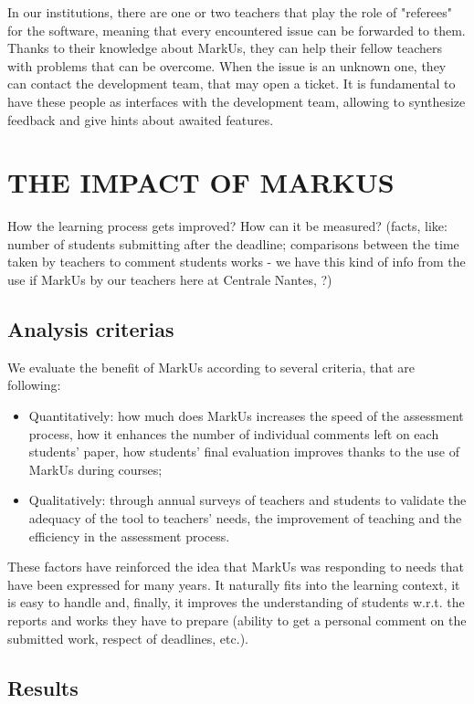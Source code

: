 \documentclass[twocolumn,10pt]{asme2e}
\begin{document}
In our institutions, there are one or two teachers that play the role of "referees" for the software, meaning that every encountered issue can be forwarded to them. Thanks to their knowledge about MarkUs, they can help their fellow teachers with problems that can be overcome. When the issue is an unknown one, they can contact the development team, that may open a ticket. It is fundamental to have these people as interfaces with the development team, allowing to synthesize feedback and give hints about awaited features. 

\section*{THE IMPACT OF MARKUS}

How the learning process gets improved? How can it be measured? (facts, like: number of students submitting after the deadline; comparisons between the time taken by teachers to comment students works - we have this kind of info from the use if MarkUs by our teachers here at Centrale Nantes, ?)

\subsection*{Analysis criterias}

We evaluate the benefit of MarkUs according to several criteria, that are following: 
\begin{itemize}
\item Quantitatively: how much does MarkUs increases the speed of the assessment process, how it enhances the number of individual comments left on each students' paper, how students' final evaluation improves thanks to the use of MarkUs during courses;
\item Qualitatively: through annual surveys of teachers and students to validate the adequacy of the tool to teachers' needs, the improvement of teaching and the efficiency in the assessment process.
\end{itemize}
These factors have reinforced the idea that MarkUs was responding to needs that have been expressed for many years. It naturally fits into the learning context, it is easy to handle and, finally, it improves the understanding of students w.r.t. the reports and works they have to prepare (ability to get a personal comment on the submitted work, respect of deadlines, etc.).

\subsection*{Results}
\end{document}
